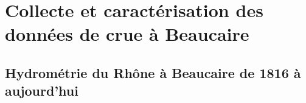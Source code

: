 %
% 
%
%
%
%
%
%


\chapter{Collecte et caractérisation des données de crue à Beaucaire}
\label{chap:ch2}
\newpage

\section{Hydrométrie du Rhône à Beaucaire de 1816 à aujourd'hui}
\label{sec:hydrometrie}

